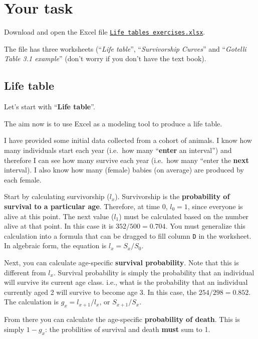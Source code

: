\documentclass[
  a4paper]{book}
\begin{document}
\hypertarget{your-task-5}{%
\section{Your task}\label{your-task-5}}

Download and open the Excel file \href{https://www.dropbox.com/s/ox0rk05zdwzrmwy/Life\%20tables\%20exercises.xlsx?dl=1}{\texttt{Life\ tables\ exercises.xlsx}}.

The file has three worksheets (``\emph{Life table}'', ``\emph{Survivorship Curves}'' and ``\emph{Gotelli
Table 3.1 example}'' (don't worry if you don't have the text book).

\hypertarget{life-table}{%
\subsection{Life table}\label{life-table}}

Let's start with ``\textbf{Life table}''.

The aim now is to use Excel as a modeling tool to produce a life table.

I have provided some initial data collected from a cohort of animals. I know how many individuals start each year (i.e.~how many ``\textbf{enter} an interval'') and therefore I can see how many survive each year (i.e.~how many ``enter the \textbf{next} interval). I also know how many (female) babies (on average) are produced by each female.

Start by calculating survivorship (\(l_x\)). Survivorship is the \textbf{probability of survival to a particular age}. Therefore, at time 0, \(l_0 = 1\), since everyone is alive at this point. The next value (\(l_1\)) must be calculated based on the number alive at that point. In this case it is \(352/500 = 0.704\). You must generalize this calculation into a formula that can be dragged to fill column \texttt{D} in the worksheet. In algebraic form, the equation is \(l_x = S_x/S_0\).

Next, you can calculate age-specific \textbf{survival probability}. Note that this is different from \(l_x\). Survival probability is simply the probability that an individual will survive its current age class. i.e., what is the probability that an individual currently aged 2 will survive to become age 3. In this case, the \(254/298 = 0.852\). The calculation is \(g_x = l_{x+1}/l_x\), or \(S_{x+1}/S_x\).

From there you can calculate the age-specific \textbf{probability of death}. This is simply \(1 - g_x\): the probilities of survival and death \textbf{must} sum to 1.
\end{document}
